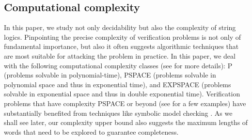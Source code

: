 

\subsection*{Computational complexity}
In this paper, we study not only decidability but also the complexity of string logics. Pinpointing the
precise complexity of verification problems is not only of fundamental
importance, but also it often suggests algorithmic techniques
that are most suitable for attacking the problem in practice.
In this paper, we deal with the following computational complexity
classes (see \cite{} for more details): P (problems solvable
in polynomial-time), PSPACE (problems solvable in polynomial
space and thus in exponential time), and EXPSPACE (problems solvable
in exponential space and thus in double exponential time). Verification
problems that have complexity PSPACE or beyond (see \cite{}
for a few examples) have substantially benefited from techniques
like symbolic model checking \cite{}. As we shall see later, our complexity
upper bound also suggests the maximum lengths of words
that need to be explored to guarantee completeness.

